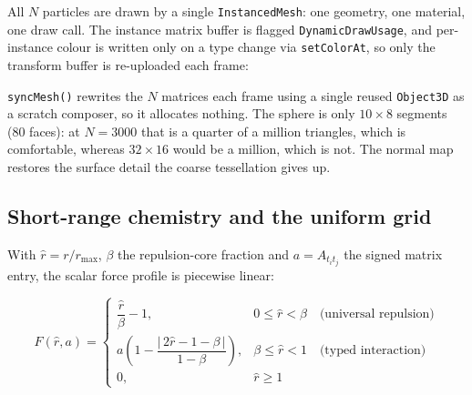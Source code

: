 \documentclass[10pt,a4paper]{article}
\newcommand{\code}[1]{\texttt{\small #1}}
\begin{document}
All $N$ particles are drawn by a single \code{InstancedMesh}: one geometry, one material, one draw call.
The instance matrix buffer is flagged \code{DynamicDrawUsage}, and per-instance colour is written only on a
type change via \code{setColorAt}, so only the transform buffer is re-uploaded each frame:

\code{syncMesh()} rewrites the $N$ matrices each frame using a single reused
\code{Object3D} as a scratch composer, so it allocates nothing. The
sphere is only $10\times8$ segments (80 faces): at $N=3000$ that is a quarter of a million triangles, which
is comfortable, whereas $32\times16$ would be a million, which is not. The normal map restores the surface
detail the coarse tessellation gives up.

\subsection{Short-range chemistry and the uniform grid}
\label{sec:chem}

With $\hat r = r/r_{\max}$, $\beta$ the repulsion-core fraction and $a=A_{t_it_j}$ the signed matrix entry,
the scalar force profile is piecewise linear:

\begin{equation}
F(\hat r, a) =
\begin{cases}
\dfrac{\hat r}{\beta} - 1, & 0 \le \hat r < \beta \quad\text{(universal repulsion)}\\[6pt]
a\left(1 - \dfrac{\big|\,2\hat r - 1 - \beta\,\big|}{1-\beta}\right), & \beta \le \hat r < 1 \quad\text{(typed interaction)}\\[6pt]
0, & \hat r \ge 1
\end{cases}
\end{equation}

\begin{center}
\end{center}
\end{document}
